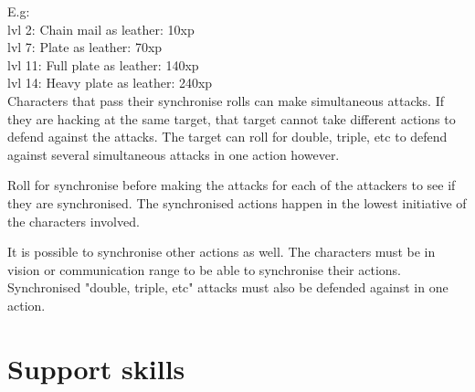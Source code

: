 \noindent E.g:\\
lvl  2: Chain mail as leather: 10xp\\     %
lvl  7: Plate as leather: 70xp\\          %
lvl 11: Full plate as leather: 140xp\\    %
lvl 14: Heavy plate as leather: 240xp\\   %

%
%
%


 Characters that pass their synchronise rolls can make simultaneous attacks. If they are hacking at the same target, that target cannot take different actions to defend against the attacks. The target can roll for double, triple, etc to defend against several simultaneous attacks in one action however.

Roll for synchronise before making the attacks for each of the attackers to see if they are synchronised. The synchronised actions happen in the lowest initiative of the characters involved.

It is possible to synchronise other actions as well. The characters must be in vision or communication range to be able to synchronise their actions.
Synchronised "double, triple, etc" attacks must also be defended against in one action.


\closeskillslist


















\section*{Support skills}

